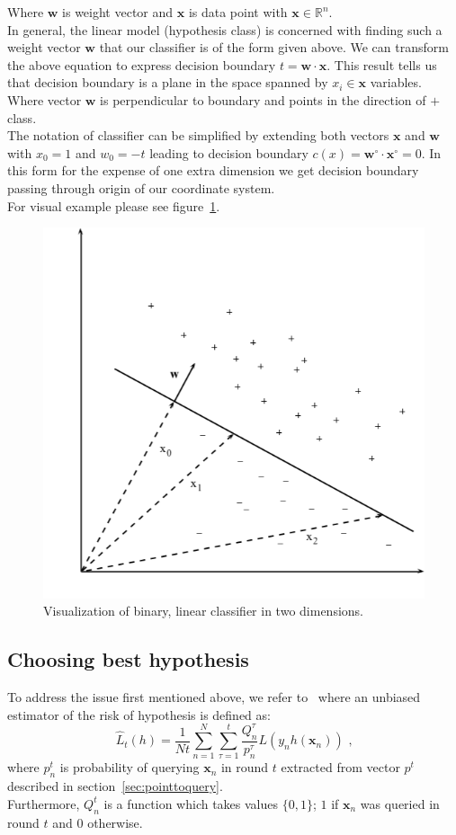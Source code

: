 \documentclass[12pt, a4paper, pdflatex, leqno, twoside]{report}
\begin{document}
Where $\mathbf{w}$ is weight vector and $\mathbf{x}$ is data point with 
$\mathbf{x} \in \mathbb{R}^n$.\\
In general, the linear model (hypothesis class) is concerned with finding such a 
weight vector $\mathbf{w}$ that our classifier is of the form given above. 
We can transform the above equation to express decision boundary $t = \mathbf{w} 
\cdot \mathbf{x}$. This result tells us that decision boundary is a plane in 
the space spanned by $x_i \in \mathbf{x}$ variables. Where vector $\mathbf{w}$ 
is perpendicular to boundary and points in the direction of $+$ class.\\
The notation of classifier can be simplified by extending both vectors 
$\mathbf{x}$ and $\mathbf{w}$ with $x_0 = 1$ and $w_0 = -t$ leading to decision 
boundary $c(x) = \mathbf{w}^{\circ} \cdot \mathbf{x}^{\circ} = 0$. In this form 
for the expense of one extra dimension we get decision boundary passing through 
origin of our coordinate system.\\
For visual example please see figure~\ref{fig:binclas}.\\

\begin{figure}[htbp]
  \centering
  \includegraphics[width=0.5\linewidth]{graphics/binclas.png}
  \begin{tiny}
    \caption{Visualization of binary, linear classifier in two 
dimensions.\label{fig:binclas}}
  \end{tiny}
  \vspace{1cm}
\end{figure}

\subsection{Choosing best hypothesis\label{sec:risk}}
To address the issue first mentioned above, we refer 
to~\citep{DBLP:journals/corr/GantiG13} where an unbiased estimator of the risk 
of hypothesis is defined as:\\
\begin{equation}\label{eq:mean}
\hat{L}_t(h) = \frac{1}{Nt} \sum_{n=1}^{N} \sum_{\tau = 1}^{t} 
\frac{Q^{\tau}_n}{p^{\tau}_n} L(y_n h(\mathbf{x}_n)) \text{~,}
\end{equation}
where $p^t_n$ is probability of querying $\mathbf{x}_n$ in round $t$ extracted 
from vector $p^t$ described in section~\ref{sec:pointtoquery}.\\
Furthermore, $Q^t_n$ is a function which takes values $\{0,1\}$; $1$ if 
$\mathbf{x}_n$ was queried in round $t$ and $0$ otherwise.\\
\end{document}
